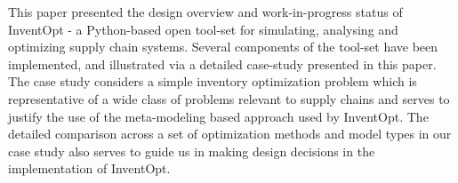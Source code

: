 
This paper presented the design overview and work-in-progress status of InventOpt - a Python-based open tool-set for simulating, analysing and optimizing supply chain systems. Several components of the tool-set have been implemented, and illustrated via a detailed case-study presented in this paper. The case study considers a simple inventory optimization problem which is representative of a wide class of problems relevant to supply chains and serves to justify the use of the meta-modeling based approach used by InventOpt. The detailed comparison across a set of optimization methods and model types in our case study also serves to guide us in making design decisions in the implementation of InventOpt.  


